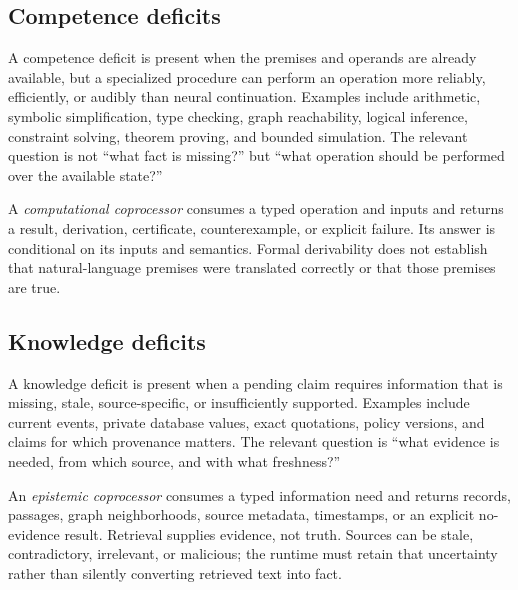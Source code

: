 \documentclass[11pt]{article}
\begin{document}
\subsection{Competence deficits}

A competence deficit is present when the premises and operands are already
available, but a specialized procedure can perform an operation more reliably,
efficiently, or audibly than neural continuation.  Examples include arithmetic,
symbolic simplification, type checking, graph reachability, logical inference,
constraint solving, theorem proving, and bounded simulation.  The relevant
question is not ``what fact is missing?'' but ``what operation should be
performed over the available state?''

A \emph{computational coprocessor} consumes a typed operation and inputs and
returns a result, derivation, certificate, counterexample, or explicit failure.
Its answer is conditional on its inputs and semantics.  Formal derivability
does not establish that natural-language premises were translated correctly or
that those premises are true.

\subsection{Knowledge deficits}

A knowledge deficit is present when a pending claim requires information that
is missing, stale, source-specific, or insufficiently supported.  Examples
include current events, private database values, exact quotations, policy
versions, and claims for which provenance matters.  The relevant question is
``what evidence is needed, from which source, and with what freshness?''

An \emph{epistemic coprocessor} consumes a typed information need and returns
records, passages, graph neighborhoods, source metadata, timestamps, or an
explicit no-evidence result.  Retrieval supplies evidence, not truth.  Sources
can be stale, contradictory, irrelevant, or malicious; the runtime must retain
that uncertainty rather than silently converting retrieved text into fact.
\end{document}
